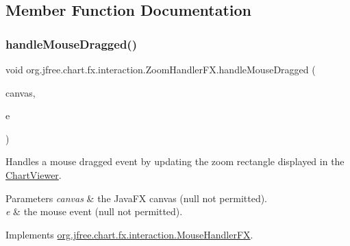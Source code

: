 \subsection{Member Function Documentation}
\mbox{\label{classorg_1_1jfree_1_1chart_1_1fx_1_1interaction_1_1_zoom_handler_f_x_a42e60db6b183e94f2997e79647bb5403}} 
\subsubsection{\texorpdfstring{handle\+Mouse\+Dragged()}{handleMouseDragged()}}
{\footnotesize\ttfamily void org.\+jfree.\+chart.\+fx.\+interaction.\+Zoom\+Handler\+F\+X.\+handle\+Mouse\+Dragged (\begin{DoxyParamCaption}\item[{\mbox{\hyperlink{classorg_1_1jfree_1_1chart_1_1fx_1_1_chart_canvas}{Chart\+Canvas}}}]{canvas,  }\item[{Mouse\+Event}]{e }\end{DoxyParamCaption})}

Handles a mouse dragged event by updating the zoom rectangle displayed in the \mbox{\hyperlink{classorg_1_1jfree_1_1chart_1_1fx_1_1_chart_viewer}{Chart\+Viewer}}.


\begin{DoxyParams}{Parameters}
{\em canvas} & the Java\+FX canvas ({\ttfamily null} not permitted). \\
\hline
{\em e} & the mouse event ({\ttfamily null} not permitted). \\
\hline
\end{DoxyParams}


Implements \mbox{\hyperlink{interfaceorg_1_1jfree_1_1chart_1_1fx_1_1interaction_1_1_mouse_handler_f_x_a06bbfd28b778bca8ef8caf90174e18f4}{org.\+jfree.\+chart.\+fx.\+interaction.\+Mouse\+Handler\+FX}}.

\mbox{\label{classorg_1_1jfree_1_1chart_1_1fx_1_1interaction_1_1_zoom_handler_f_x_a39eb9924bd9125f685df78a26fe8317d}} 
